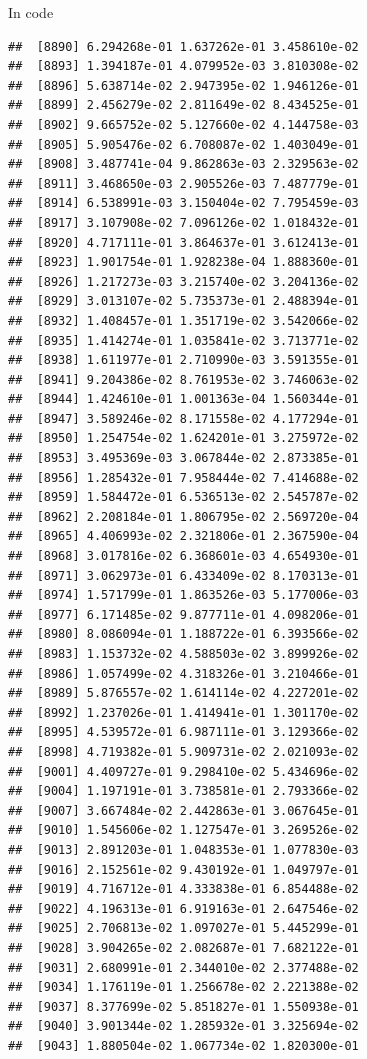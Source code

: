 \documentclass[ignorenonframetext,]{beamer}
\begin{document}
\begin{frame}[fragile]{In code}
\begin{verbatim}
##  [8890] 6.294268e-01 1.637262e-01 3.458610e-02
##  [8893] 1.394187e-01 4.079952e-03 3.810308e-02
##  [8896] 5.638714e-02 2.947395e-02 1.946126e-01
##  [8899] 2.456279e-02 2.811649e-02 8.434525e-01
##  [8902] 9.665752e-02 5.127660e-02 4.144758e-03
##  [8905] 5.905476e-02 6.708087e-02 1.403049e-01
##  [8908] 3.487741e-04 9.862863e-03 2.329563e-02
##  [8911] 3.468650e-03 2.905526e-03 7.487779e-01
##  [8914] 6.538991e-03 3.150404e-02 7.795459e-03
##  [8917] 3.107908e-02 7.096126e-02 1.018432e-01
##  [8920] 4.717111e-01 3.864637e-01 3.612413e-01
##  [8923] 1.901754e-01 1.928238e-04 1.888360e-01
##  [8926] 1.217273e-03 3.215740e-02 3.204136e-02
##  [8929] 3.013107e-02 5.735373e-01 2.488394e-01
##  [8932] 1.408457e-01 1.351719e-02 3.542066e-02
##  [8935] 1.414274e-01 1.035841e-02 3.713771e-02
##  [8938] 1.611977e-01 2.710990e-03 3.591355e-01
##  [8941] 9.204386e-02 8.761953e-02 3.746063e-02
##  [8944] 1.424610e-01 1.001363e-04 1.560344e-01
##  [8947] 3.589246e-02 8.171558e-02 4.177294e-01
##  [8950] 1.254754e-02 1.624201e-01 3.275972e-02
##  [8953] 3.495369e-03 3.067844e-02 2.873385e-01
##  [8956] 1.285432e-01 7.958444e-02 7.414688e-02
##  [8959] 1.584472e-01 6.536513e-02 2.545787e-02
##  [8962] 2.208184e-01 1.806795e-02 2.569720e-04
##  [8965] 4.406993e-02 2.321806e-01 2.367590e-04
##  [8968] 3.017816e-02 6.368601e-03 4.654930e-01
##  [8971] 3.062973e-01 6.433409e-02 8.170313e-01
##  [8974] 1.571799e-01 1.863526e-03 5.177006e-03
##  [8977] 6.171485e-02 9.877711e-01 4.098206e-01
##  [8980] 8.086094e-01 1.188722e-01 6.393566e-02
##  [8983] 1.153732e-02 4.588503e-02 3.899926e-02
##  [8986] 1.057499e-02 4.318326e-01 3.210466e-01
##  [8989] 5.876557e-02 1.614114e-02 4.227201e-02
##  [8992] 1.237026e-01 1.414941e-01 1.301170e-02
##  [8995] 4.539572e-01 6.987111e-01 3.129366e-02
##  [8998] 4.719382e-01 5.909731e-02 2.021093e-02
##  [9001] 4.409727e-01 9.298410e-02 5.434696e-02
##  [9004] 1.197191e-01 3.738581e-01 2.793366e-02
##  [9007] 3.667484e-02 2.442863e-01 3.067645e-01
##  [9010] 1.545606e-02 1.127547e-01 3.269526e-02
##  [9013] 2.891203e-01 1.048353e-01 1.077830e-03
##  [9016] 2.152561e-02 9.430192e-01 1.049797e-01
##  [9019] 4.716712e-01 4.333838e-01 6.854488e-02
##  [9022] 4.196313e-01 6.919163e-01 2.647546e-02
##  [9025] 2.706813e-02 1.097027e-01 5.445299e-01
##  [9028] 3.904265e-02 2.082687e-01 7.682122e-01
##  [9031] 2.680991e-01 2.344010e-02 2.377488e-02
##  [9034] 1.176119e-01 1.256678e-02 2.221388e-02
##  [9037] 8.377699e-02 5.851827e-01 1.550938e-01
##  [9040] 3.901344e-02 1.285932e-01 3.325694e-02
##  [9043] 1.880504e-02 1.067734e-02 1.820300e-01

\end{verbatim}
\end{frame}
\end{document}
